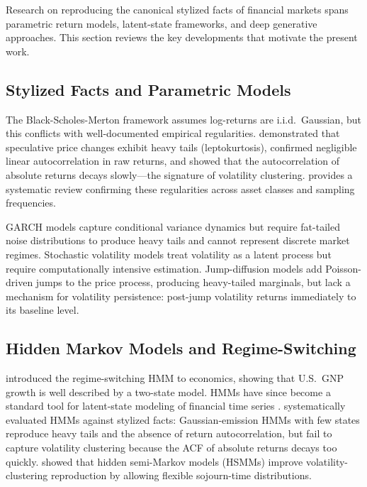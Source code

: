 Research on reproducing the canonical stylized facts of financial markets spans parametric return models, latent-state frameworks, and deep generative approaches.
This section reviews the key developments that motivate the present work.

\subsection{Stylized Facts and Parametric Models}

The Black-Scholes-Merton framework \citep{black1973pricing} assumes log-returns are i.i.d.\ Gaussian, but this conflicts with well-documented empirical regularities.
\citet{mandelbrot1963variation} demonstrated that speculative price changes exhibit heavy tails (leptokurtosis), \citet{fama1970efficient} confirmed negligible linear autocorrelation in raw returns, and \citet{schwert1989does} showed that the autocorrelation of absolute returns decays slowly---the signature of volatility clustering.
\citet{cont2001empirical} provides a systematic review confirming these regularities across asset classes and sampling frequencies.

GARCH models \citep{engle1982autoregressive, bollerslev1986generalized} capture conditional variance dynamics but require fat-tailed noise distributions to produce heavy tails and cannot represent discrete market regimes.
Stochastic volatility models \citep{heston1993closed} treat volatility as a latent process but require computationally intensive estimation.
Jump-diffusion models \citep{merton1976option, kou2002jump} add Poisson-driven jumps to the price process, producing heavy-tailed marginals, but lack a mechanism for volatility persistence: post-jump volatility returns immediately to its baseline level.

\subsection{Hidden Markov Models and Regime-Switching}

\citet{hamilton1989new} introduced the regime-switching HMM to economics, showing that U.S.\ GNP growth is well described by a two-state model.
HMMs have since become a standard tool for latent-state modeling of financial time series \citep{kim1999has, nguyen2018hidden, rossi2006volatility}.
\citet{ryden1998stylized} systematically evaluated HMMs against stylized facts: Gaussian-emission HMMs with few states reproduce heavy tails and the absence of return autocorrelation, but fail to capture volatility clustering because the ACF of absolute returns decays too quickly.
\citet{bulla2006stylized} showed that hidden semi-Markov models (HSMMs) improve volatility-clustering reproduction by allowing flexible sojourn-time distributions.


